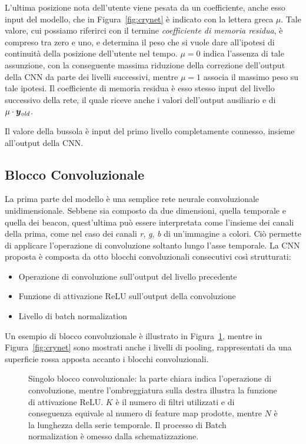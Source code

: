 L'ultima posizione nota dell'utente viene pesata da un coefficiente, anche esso
input del modello, che in Figura~\ref{fig:crynet} è indicato con la lettera
greca \(\mu\). Tale valore, cui possiamo riferirci con il termine
\emph{coefficiente di memoria residua}, è compreso tra zero e uno, e determina
il peso che si vuole dare all'ipotesi di continuità della posizione dell'utente
nel tempo.  \(\mu = 0\) indica l'assenza di tale assunzione, con la conseguente
massima riduzione della correzione dell'output della CNN da parte dei livelli
successivi, mentre \(\mu = 1 \) associa il massimo peso su tale ipotesi. Il
coefficiente di memoria residua è esso stesso input del livello successivo
della rete, il quale riceve anche i valori dell'output ausiliario e di 
\(\mu \cdot \bm y_{\mathit{old}}\).

Il valore della bussola è input del primo livello completamente connesso,
insieme all'output della CNN\@.
\subsection{Blocco Convoluzionale}
La prima parte del modello è una semplice rete neurale convoluzionale
unidimensionale. Sebbene sia composto da due dimensioni, quella temporale e
quella dei beacon, quest'ultima può essere interpretata come l'insieme dei
canali della prima, come nel caso dei canali \emph{r}, \emph{g}, \emph{b} di
un'immagine a colori. Ciò permette di applicare l'operazione di convoluzione
soltanto lungo l'asse temporale.
La CNN proposta è composta da otto blocchi convoluzionali consecutivi così
strutturati:
\begin{itemize}
    \item Operazione di convoluzione sull'output del livello precedente
    \item Funzione di attivazione ReLU sull'output della convoluzione
    \item Livello di batch normalization
\end{itemize}
Un esempio di blocco convoluzionale è illustrato in Figura~\ref{fig:cnnblock},
mentre in Figura~\ref{fig:crynet} sono mostrati anche i livelli di pooling,
rappresentati da una superficie rossa apposta accanto i blocchi convoluzionali.
\begin{figure}
  \caption{Singolo blocco convoluzionale: la parte chiara indica l'operazione
    di convoluzione, mentre l'ombreggiatura sulla destra illustra la funzione
    di attivazione ReLU\@. \(K\) è il numero di filtri utilizzati e di
    conseguenza equivale al numero di feature map prodotte, mentre \(N\) è la
    lunghezza della serie temporale. Il processo di Batch normalization è
    omesso dalla schematizzazione.}%
  \label{fig:cnnblock}%
\end{figure}

